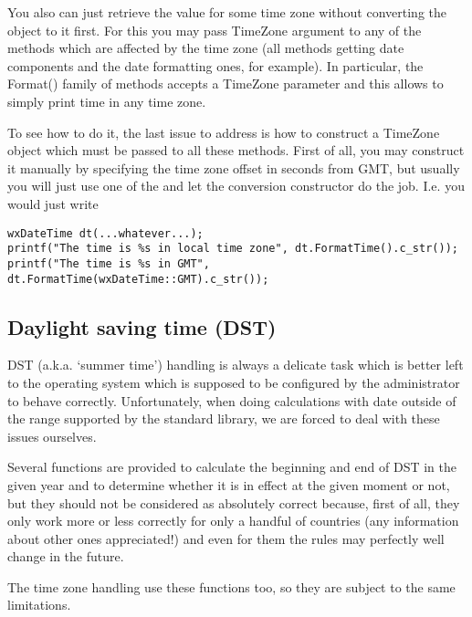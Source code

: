 You also can just retrieve the value for some time zone without converting the
object to it first. For this you may pass TimeZone argument to any of the
methods which are affected by the time zone (all methods getting date
components and the date formatting ones, for example). In particular, the
Format() family of methods accepts a TimeZone parameter and this allows to
simply print time in any time zone.

To see how to do it, the last issue to address is how to construct a TimeZone
object which must be passed to all these methods. First of all, you may construct
it manually by specifying the time zone offset in seconds from GMT, but
usually you will just use one of the  and
let the conversion constructor do the job.
I.e. you would just write

\begin{verbatim}
wxDateTime dt(...whatever...);
printf("The time is %s in local time zone", dt.FormatTime().c_str());
printf("The time is %s in GMT", dt.FormatTime(wxDateTime::GMT).c_str());
\end{verbatim}

\subsection{Daylight saving time (DST)}\label{tdatedst}

DST (a.k.a. `summer time') handling is always a delicate task which is better
left to the operating system which is supposed to be configured by the
administrator to behave correctly. Unfortunately, when doing calculations with
date outside of the range supported by the standard library, we are forced to
deal with these issues ourselves.

Several functions are provided to calculate the beginning and end of DST in
the given year and to determine whether it is in effect at the given moment or
not, but they should not be considered as absolutely correct because, first of
all, they only work more or less correctly for only a handful of countries
(any information about other ones appreciated!) and even for them the rules
may perfectly well change in the future.

The time zone handling  use these functions
too, so they are subject to the same limitations.


